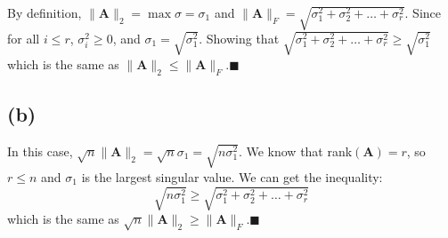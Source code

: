 \documentclass{article}
\newcommand{\mat}[1]{\mathbf{#1}}
\begin{document}
By definition, $\|\mat{A}\|_2 = \max \sigma = \sigma_1$ and $\|\mat{A}\|_F = \sqrt{\sigma_1^2+ \sigma_2^2+\dots+ \sigma_r^2}$.
Since for all $i \leq r$, $\sigma_i^2 \geq 0$, and $\sigma_1 = \sqrt{\sigma_1^2}$. Showing that $\sqrt{\sigma_1^2+ \sigma_2^2+\dots+ \sigma_r^2}
\geq \sqrt{\sigma_1^2} $ which is the same as $\| \mat{A}\|_2 \leq \|\mat{A}\|_F$.$\blacksquare$

\subsection*{(b)}
In this case, $\sqrt{n}\|\mat{A}\|_2 = \sqrt{n}\sigma_1 = \sqrt{n\sigma_1^2}$. We know that rank$(\mat{A}) = r$, so $r \leq n$ and $\sigma_1$ is the largest
singular value. We can get the inequality:
$$\sqrt{n\sigma_1^2} \geq \sqrt{\sigma_1^2+ \sigma_2^2+\dots+ \sigma_r^2}$$
which is the same as $\sqrt{n} \| \mat{A} \|_2 \geq \| \mat{A} \|_F$.$\blacksquare$
\end{document}
